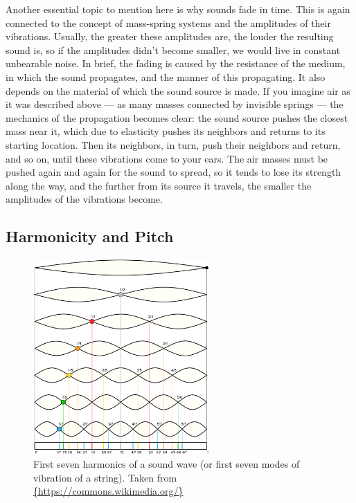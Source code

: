 Another essential topic to mention here is why sounds fade in time. This is again connected to the concept of mass-spring systems and the amplitudes of their vibrations. Usually, the greater these amplitudes are, the louder the resulting sound is, so if the amplitudes didn’t become smaller, we would live in constant unbearable noise. In brief, the fading is caused by the resistance of the medium, in which the sound propagates, and the manner of this propagating. It also depends on the material of which the sound source is made. If you imagine air as it was described above --- as many masses connected by invisible springs --- the mechanics of the propagation becomes clear: the sound source pushes the closest mass near it, which due to elasticity pushes its neighbors and returns to its starting location. Then its neighbors, in turn, push their neighbors and return, and so on, until these vibrations come to your ears. The air masses must be pushed again and again for the sound to spread, so it tends to lose its strength along the way, and the further from its source it travels, the smaller the amplitudes of the vibrations become.

\subsection{Harmonicity and Pitch}\label{section:physics_harmonics_pitch}

\begin{figure}[t]
	\centering
	\includegraphics[width=0.6\textwidth]{include/harmonics}
	\caption[Harmonics of a sound wave]{First seven harmonics of a sound wave (or first seven modes of vibration of a string). Taken from \url{{https://commons.wikimedia.org/}}}
	\label{img:harmonics}
\end{figure}

